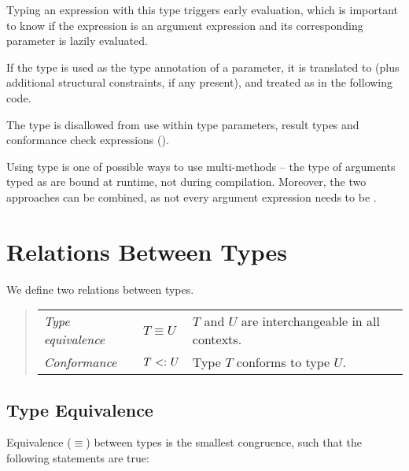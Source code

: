 Typing an expression with this type triggers early evaluation, which is important to know if the expression is an argument expression and its corresponding parameter is lazily evaluated. 

If the  type is used as the type annotation of a parameter, it is translated to  (plus additional structural constraints, if any present), and treated as  in the following code.

The  type is disallowed from use within type parameters, result types and conformance check expressions (). 

Using  type is one of possible ways to use multi-methods -- the type of arguments typed as  are bound at runtime, not during compilation. Moreover, the two approaches can be combined, as not every argument expression needs to be .





\section{Relations Between Types}

We define two relations between types. 
\begin{quote}\begin{tabular}{l@{\gap}l@{\gap}l}
\em Type equivalence & $T \equiv U$ & $T$ and $U$ are interchangeable
in all contexts.
\\
\em Conformance & $T \conforms U$ & Type $T$ conforms to type $U$.
\end{tabular}\end{quote}






\subsection{Type Equivalence}

Equivalence ($\equiv$) between types is the smallest congruence, such that the following statements are true:

